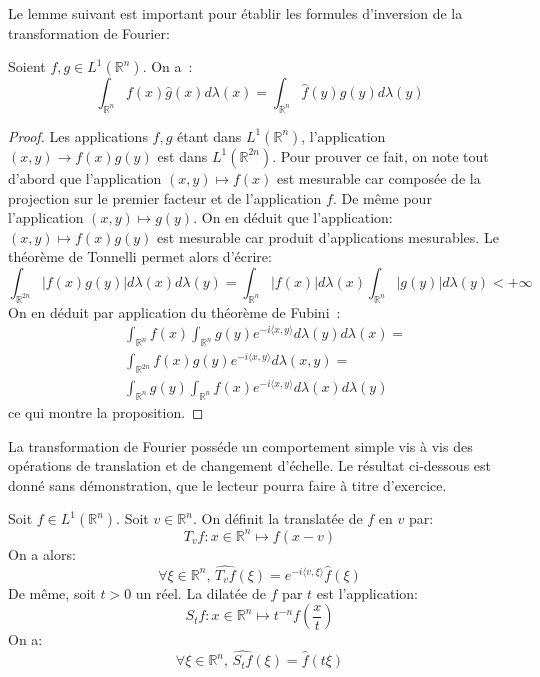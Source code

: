 Le lemme suivant est important pour établir les formules d'inversion de la
transformation de Fourier:
\begin{mandatory}
\begin{prop}\label{fourier:1}
Soient $f,g \in L^1(\mathbb{R}^n)$. On a~:
\[
\int_{\mathbb{R}^n} f(x) \widehat{g}(x) d \lambda(x) = \int_{\mathbb{R}^n} \widehat{f}(y) g(y) d \lambda(y)
\]
\end{prop}
\end{mandatory}
\begin{proof}
Les applications $f, g$ étant dans $L^1(\mathbb{R}^n)$,
l'application $(x,y) \to f(x)g(y)$ est dans $L^1(\mathbb{R}^{2n})$. 
Pour prouver ce fait, on note tout d'abord que l'application $(x,y) \mapsto
f(x)$ est mesurable car composée de la projection sur le premier facteur et de
l'application $f$. De même pour l'application $(x,y) \mapsto g(y)$. On en déduit
que l'application: $(x,y) \mapsto f(x)g(y)$ est mesurable car produit
d'applications mesurables. Le théorème de Tonnelli permet alors d'écrire:
\[
\int_{\mathbb{R}^{2n}}|f(x)g(y)|d\lambda(x)d\lambda(y) = \int_{\mathbb{R}^n}
|f(x)| d \lambda(x)\int_{\mathbb{R}^n}
|g(y)| d \lambda(y) < +\infty
\]
 On en
déduit par application du théorème de Fubini~:
\begin{align*}
& \int_{\mathbb{R}^n} f(x) \int_{\mathbb{R}^n} g(y) e^{-i \langle x,y
      \rangle} d \lambda(y) d  \lambda(x) = \\
& \int_{\mathbb{R}^{2n}} f(x) g(y) e^{-i \langle x,y
      \rangle} d \lambda (x,y) = \\
&\int_{\mathbb{R}^n} g(y) \int_{\mathbb{R}^n} f(x) e^{-i \langle x,y
      \rangle} d \lambda(x) d  \lambda(y) 
\end{align*}
ce qui montre la proposition.
\end{proof}
La transformation de Fourier posséde un comportement simple vis à vis des
opérations de translation et de changement d'échelle. Le résultat ci-dessous est
donné sans démonstration, que le lecteur pourra faire à titre d'exercice.
\begin{mandatory}
\begin{prop}
Soit $f \in L^1(\mathbb{R}^n)$. Soit $v \in \mathbb{R}^n$. On définit la
translatée de $f$ en $v$ par:
\[
T_v f \colon x \in \mathbb{R}^n \mapsto f(x-v)
\]
On a alors:
\[
\forall \xi \in \mathbb{R}^n, \, \widehat{T_v f}(\xi) = e^{-i \langle
v, \xi \rangle}\widehat{f}(\xi)
\]
De même, soit $t > 0$ un réel. La dilatée de $f$ par $t$ est l'application:
\[
S_t f \colon x \in \mathbb{R}^n \mapsto t^{-n} f\left(\frac{x}{t}\right)
\]
On a:
\[
\forall \xi \in \mathbb{R}^n, \, \widehat{S_t f}(\xi) = \widehat{f}(t \xi)
\]
\end{prop}
\end{mandatory}
